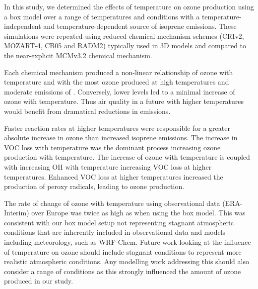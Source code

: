 In this study, we determined the effects of temperature on ozone production using a box model over a range of temperatures and  conditions with a temperature-independent and temperature-dependent source of isoprene emissions.
These simulations were repeated using reduced chemical mechanism schemes (CRIv2, MOZART-4, CB05 and RADM2) typically used in 3D models and compared to the near-explicit MCMv3.2 chemical mechanism.

Each chemical mechanism produced a non-linear relationship of ozone with temperature and  with the most ozone produced at high temperatures and moderate emissions of .
Conversely, lower  levels led to a minimal increase of ozone with temperature.
Thus air quality in a future with higher temperatures would benefit from dramatical reductions in  emissions.

Faster reaction rates at higher temperatures were responsible for a greater absolute increase in ozone than increased isoprene emissions.
The increase in VOC loss with temperature was the dominant process increasing ozone production with temperature.
The increase of ozone with temperature is coupled with increasing OH with temperature increasing VOC loss at higher temperatures.
Enhanced VOC loss at higher temperatures increased the production of peroxy radicals, leading to ozone production.

The rate of change of ozone with temperature using observational data (ERA-Interim) over Europe was twice as high as when using the box model.
This was consistent with our box model setup not representing stagnant atmospheric conditions that are inherently included in observational data and models including meteorology, such as WRF-Chem.
Future work looking at the influence of temperature on ozone should include stagnant conditions to represent more realistic atmospheric conditions.
Any modelling work addressing this should also consider a range of  conditions as this strongly influenced the amount of ozone produced in our study.
